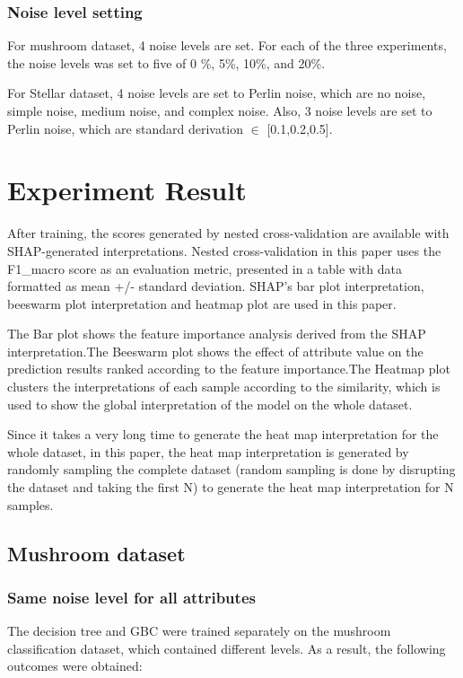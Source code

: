 \documentclass[runningheads,a4paper]{llncs}
\begin{document}
\subsubsection{Noise level setting}
For mushroom dataset, 4 noise levels are set.
For each of the three experiments, the noise levels was set to five of 0 \%, 5\%, 10\%, and 20\%.

For Stellar dataset, 4 noise levels are set to Perlin noise, which are no noise, simple noise, medium noise, and complex noise. Also, 3 noise levels are set to Perlin noise, which are standard derivation $\in$ [0.1,0.2,0.5].

\section{Experiment Result}
After training, the scores generated by nested cross-validation are available with SHAP-generated interpretations. Nested cross-validation in this paper uses the F1\_macro score as an evaluation metric, presented in a table with data formatted as mean +/- standard deviation. SHAP's bar plot interpretation, beeswarm plot interpretation and heatmap plot are used in this paper.

The Bar plot shows the feature importance analysis derived from the SHAP interpretation.The Beeswarm plot shows the effect of attribute value on the prediction results ranked according to the feature importance.The Heatmap plot clusters the interpretations of each sample according to the similarity, which is used to show the global interpretation of the model on the whole dataset.

Since it takes a very long time to generate the heat map interpretation for the whole dataset, in this paper, the heat map interpretation is generated by randomly sampling the complete dataset (random sampling is done by disrupting the dataset and taking the first N) to generate the heat map interpretation for N samples.
\subsection{Mushroom dataset}

\subsubsection{Same noise level for all attributes}

The decision tree and GBC were trained separately on the mushroom classification dataset, which contained different levels. As a result, the following outcomes were obtained:
\end{document}
